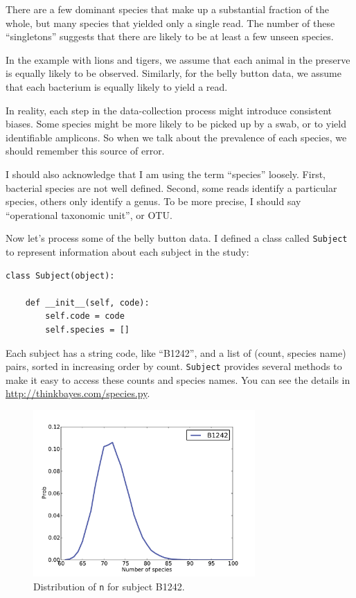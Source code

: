 \documentclass[12pt]{book}
\begin{document}
There are a few dominant species that make up a substantial
fraction of the whole, but many species that yielded only
a single read.  The number of these ``singletons'' suggests
that there are likely to be at least a few unseen species.

In the example with lions and tigers, we assume that each
animal in the preserve is equally likely to be observed.
Similarly, for the belly button data, we assume that each
bacterium is equally likely to yield a read.

In reality, each step in the data-collection
process might introduce consistent biases.  Some species might
be more likely to be picked up by a swab, or to yield identifiable
amplicons.  So when we talk about the prevalence of each species,
we should remember this source of error.

I should also acknowledge that I am using the term ``species''
loosely.  First, bacterial species are not well defined.  Second,
some reads identify a particular species, others only identify
a genus.  To be more precise, I should say ``operational
taxonomic unit'', or OTU.

Now let's process some of the belly button data.  I defined
a class called {\tt Subject} to represent information about
each subject in the study:

\begin{verbatim}
class Subject(object):

    def __init__(self, code):
        self.code = code
        self.species = []
\end{verbatim}

Each subject has a string code, like ``B1242'', and a list of
(count, species name) pairs, sorted in increasing order by count.
{\tt Subject} provides several methods to make it
easy to access these counts and species names.  You can see the details
in \url{http://thinkbayes.com/species.py}.

\begin{figure}
\centerline{\includegraphics[height=2.5in]{figs/species-ndist-B1242.pdf}}
\caption{Distribution of {\tt n} for subject B1242.}
\label{species-ndist}
\end{figure}
\end{document}
